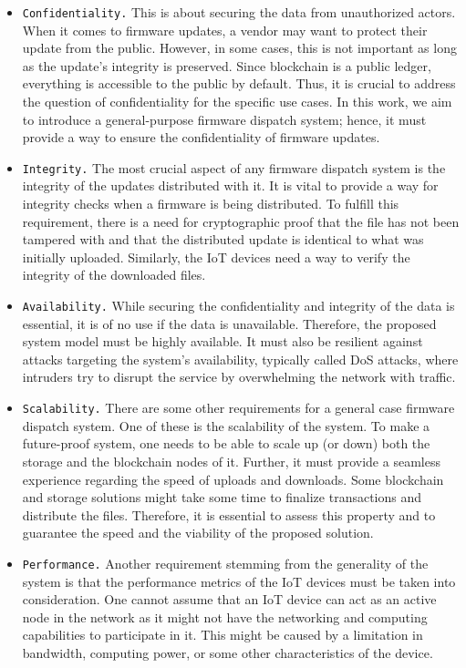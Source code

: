 \documentclass[conference]{IEEEtran}
\begin{document}
\begin{itemize}
\item \texttt{Confidentiality.} This is about securing the data from unauthorized actors. When it comes to firmware updates, a vendor may want to protect their update from the public. However, in some cases, this is not important as long as the update's integrity is preserved. Since blockchain is a public ledger, everything is accessible to the public by default. Thus, it is crucial to address the question of confidentiality for the specific use cases. In this work, we aim to introduce a general-purpose firmware dispatch system; hence, it must provide a way to ensure the confidentiality of firmware updates.

\item \texttt{Integrity.} The most crucial aspect of any firmware dispatch system is the integrity of the updates distributed with it. It is vital to provide a way for integrity checks when a firmware is being distributed. To fulfill this requirement, there is a need for cryptographic proof that the file has not been tampered with and that the distributed update is identical to what was initially uploaded. Similarly, the IoT devices need a way to verify the integrity of the downloaded files.

\item \texttt{Availability.} While securing the confidentiality and integrity of the data is essential, it is of no use if the data is unavailable. Therefore, the proposed system model must be highly available. It must also be resilient against attacks targeting the system's availability, typically called DoS attacks, where intruders try to disrupt the service by overwhelming the network with traffic. %

\item \texttt{Scalability.} There are some other requirements for a general case firmware dispatch system. One of these is the scalability of the system. To make a future-proof system, one needs to be able to scale up (or down) both the storage and the blockchain nodes of it. Further, it must provide a seamless experience regarding the speed of uploads and downloads. Some blockchain and storage solutions might take some time to finalize transactions and distribute the files. Therefore, it is essential to assess this property and to guarantee the speed and the viability of the proposed solution.

\item \texttt{Performance.} Another requirement stemming from the generality of the system is that the performance metrics of the IoT devices must be taken into consideration. One cannot assume that an IoT device can act as an active node in the network as it might not have the networking and computing capabilities to participate in it. This might be caused by a limitation in bandwidth, computing power, or some other characteristics of the device.


\end{itemize}
\end{document}
